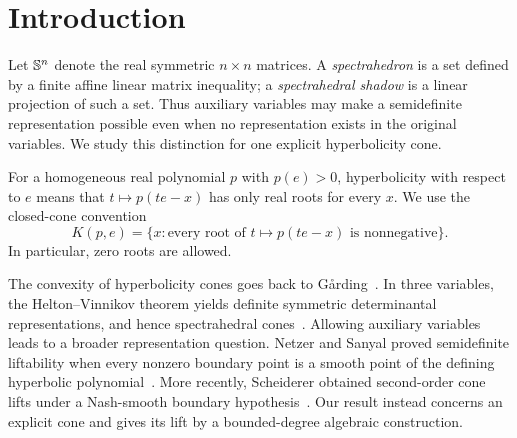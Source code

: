 \section{Introduction}
\label{sec:introduction}

Let $\mathbb S^n$ denote the real symmetric $n\times n$ matrices. A
\emph{spectrahedron} is a set defined by a finite affine linear matrix
inequality; a \emph{spectrahedral shadow} is a linear projection of such
a set. Thus auxiliary variables may make a semidefinite representation
possible even when no representation exists in the original variables.
We study this distinction for one explicit hyperbolicity cone.

For a homogeneous real polynomial $p$ with $p(e)>0$, hyperbolicity with
respect to $e$ means that $t\mapsto p(te-x)$ has only real roots for
every $x$. We use the closed-cone convention
\[
 K(p,e)=\{x:\text{every root of }t\mapsto p(te-x)
                    \text{ is nonnegative}\}.
\]
In particular, zero roots are allowed.

The convexity of hyperbolicity cones goes back to
G\aa rding~\cite{garding1959}. In three variables, the
Helton--Vinnikov theorem yields definite symmetric determinantal
representations, and hence spectrahedral
cones~\cite{helton-vinnikov2007,lewis-parrilo-ramana2005}.
Allowing auxiliary variables leads to a broader representation question.
Netzer and Sanyal proved semidefinite liftability when every nonzero
boundary point is a smooth point of the defining hyperbolic
polynomial~\cite{netzer-sanyal2015}. More recently, Scheiderer obtained
second-order cone lifts under a Nash-smooth boundary
hypothesis~\cite{scheiderer2025}. Our result instead concerns an explicit
cone and gives its lift by a bounded-degree algebraic construction.

